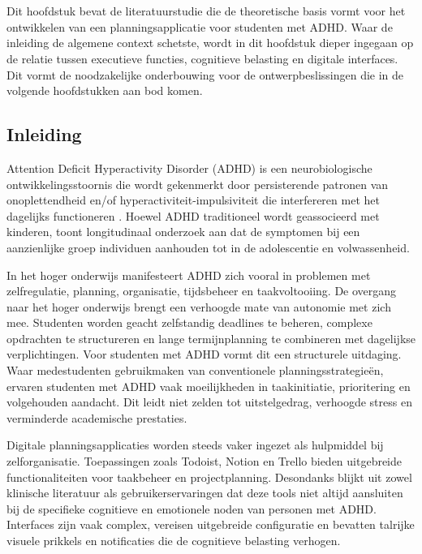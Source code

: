 \chapter{}%
\label{ch:stand-van-zaken}

Dit hoofdstuk bevat de literatuurstudie die de theoretische basis vormt voor het ontwikkelen van een planningsapplicatie voor studenten met ADHD. Waar de inleiding de algemene context schetste, wordt in dit hoofdstuk dieper ingegaan op de relatie tussen executieve functies, cognitieve belasting en digitale interfaces. Dit vormt de noodzakelijke onderbouwing voor de ontwerpbeslissingen die in de volgende hoofdstukken aan bod komen.

\section{Inleiding}
Attention Deficit Hyperactivity Disorder (ADHD) is een neurobiologische ontwikkelingsstoornis die wordt gekenmerkt door persisterende patronen van onoplettendheid en/of hyperactiviteit-impulsiviteit die interfereren met het dagelijks functioneren \autocite{AmericanPsychiatricAssociation2013}. Hoewel ADHD traditioneel wordt geassocieerd met kinderen, toont longitudinaal onderzoek aan dat de symptomen bij een aanzienlijke groep individuen aanhouden tot in de adolescentie en volwassenheid.

In het hoger onderwijs manifesteert ADHD zich vooral in problemen met zelfregulatie, planning, organisatie, tijdsbeheer en taakvoltooiing. De overgang naar het hoger onderwijs brengt een verhoogde mate van autonomie met zich mee. Studenten worden geacht zelfstandig deadlines te beheren, complexe opdrachten te structureren en lange termijnplanning te combineren met dagelijkse verplichtingen. Voor studenten met ADHD vormt dit een structurele uitdaging. Waar medestudenten gebruikmaken van conventionele planningsstrategieën, ervaren studenten met ADHD vaak moeilijkheden in taakinitiatie, prioritering en volgehouden aandacht. Dit leidt niet zelden tot uitstelgedrag, verhoogde stress en verminderde academische prestaties.

Digitale planningsapplicaties worden steeds vaker ingezet als hulpmiddel bij zelforganisatie. Toepassingen zoals Todoist, Notion en Trello bieden uitgebreide functionaliteiten voor taakbeheer en projectplanning. Desondanks blijkt uit zowel klinische literatuur als gebruikerservaringen dat deze tools niet altijd aansluiten bij de specifieke cognitieve en emotionele noden van personen met ADHD. Interfaces zijn vaak complex, vereisen uitgebreide configuratie en bevatten talrijke visuele prikkels en notificaties die de cognitieve belasting verhogen.

